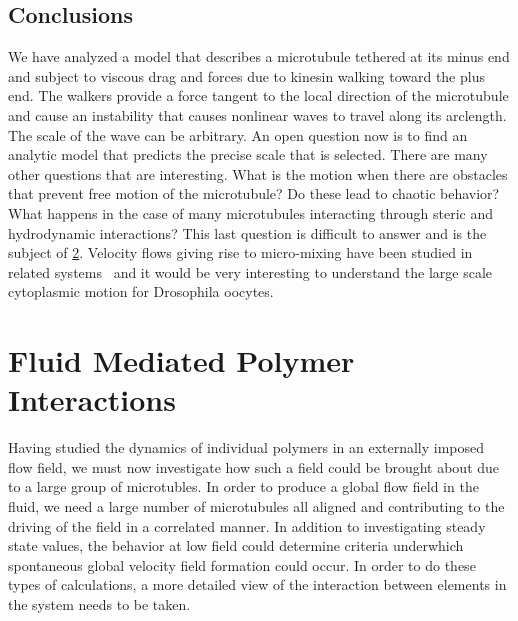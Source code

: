 \documentclass[11pt]{ucthesis}
\begin{document}
{\section{Conclusions}

We have analyzed a model that describes a microtubule tethered at its minus
end and subject to viscous drag and forces due to kinesin walking toward the plus end. The walkers
provide a force tangent to the local direction of the microtubule and
cause an instability that causes nonlinear waves to travel along its
arclength. The scale of the wave can be arbitrary. An open question now 
is to find an analytic model that predicts the precise scale that
is selected. There are many other questions that are interesting.
What is the motion when there are obstacles that prevent free motion
of the microtubule? Do these lead to chaotic behavior? What happens
in the case of many microtubules interacting through steric and hydrodynamic
interactions? This last question is difficult to answer and is the subject of \ref{chap:Interact}. Velocity
flows giving rise to micro-mixing have been studied in related systems~\cite{GoldsteinTuvalvandeMeentPNAS,GoldsteinTuvalvandeMeentPRL,MeentSedermanGladdenGoldstein,VerchotLubiczGoldstein} and it would be very interesting to
understand the large scale cytoplasmic motion for Drosophila oocytes.







\chapter{Fluid Mediated Polymer Interactions}
\label{chap:Interact}
Having studied the dynamics of individual polymers in an externally imposed flow field, we must now investigate how such a field could be brought about due to a large group of microtubles. 
In order to produce a global flow field in the fluid, we need a large number of microtubules all aligned and contributing to the driving of the field in a correlated manner. 
In addition to investigating steady state values, the behavior at low field could determine criteria underwhich spontaneous global velocity field formation could occur. In order to do these types of calculations, a more detailed view of the interaction between elements in the system needs to be taken.

}
\end{document}
